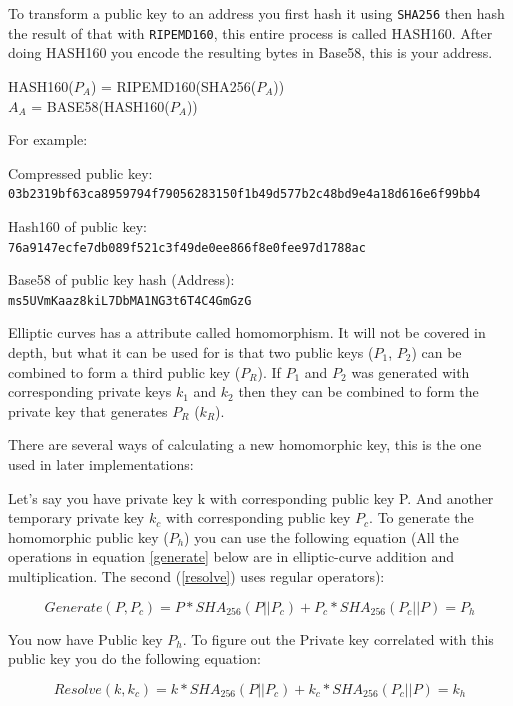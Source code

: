 To transform a public key to an address you first hash it using \texttt{SHA256} then hash the result of that with \texttt{RIPEMD160}, this entire process is called HASH160. After doing HASH160 you encode the resulting bytes in Base58, this is your address.\cite{antonopoulos_2017}

HASH160($P_A$) = RIPEMD160(SHA256($P_A$))\\
$A_A$ = BASE58(HASH160($P_A$))

For example:

Compressed public key:\\
\texttt{03b2319bf63ca8959794f79056283150f1b49d577b2c48bd9e4a18d616e6f99bb4}

Hash160 of public key:\\
\texttt{76a9147ecfe7db089f521c3f49de0ee866f8e0fee97d1788ac}

Base58 of public key hash (Address):\\
\texttt{ms5UVmKaaz8kiL7DbMA1NG3t6T4C4GmGzG}

\label{homomorphism}
Elliptic curves has a attribute called homomorphism. It will not be covered in depth, but what it can be used for is that two public keys ($P_1$, $P_2$) can be combined to form a third public key ($P_R$). If $P_1$ and $P_2$ was generated with corresponding private keys $k_1$ and $k_2$ then they can be combined to form the private key that generates $P_R$ ($k_R$).\cite{miller_1986}\cite{bolt}

There are several ways of calculating a new homomorphic key, this is the one used in later implementations:

Let's say you have private key k with corresponding public key P. And another temporary private key $k_c$ with corresponding public key $P_c$. To generate the homomorphic public key ($P_h$) you can use the following equation (All the operations in equation \ref{generate} below are in elliptic-curve addition and multiplication. The second (\ref{resolve}) uses regular operators):

\begin{equation}\label{generate}
Generate(P, P_c) = P * SHA_{256}(P || P_c) + P_c * SHA_{256}(P_c || P) = P_h
\end{equation}

You now have Public key $P_h$. To figure out the Private key correlated with this public key you do the following equation:

\begin{equation}\label{resolve}
Resolve(k, k_c) = k * SHA_{256}(P || P_c) + k_c * SHA_{256}(P_c || P) = k_h
\end{equation}

